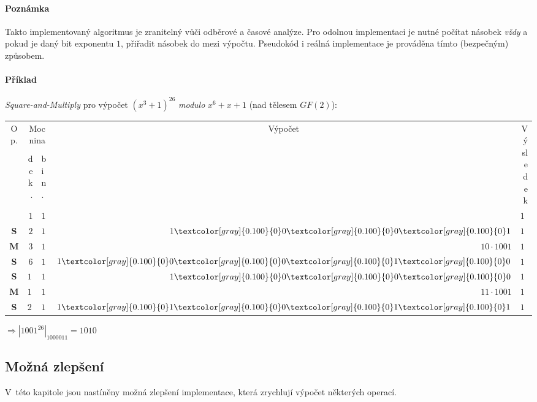 \documentclass[thesis=M,czech,hidelinks]{FITthesis}[2012/06/26]
\newcommand{\0}{{\textcolor[gray]{0.100}{0}}}
\begin{document}
\paragraph{Poznámka} Takto implementovaný algoritmus je zranitelný vůči odběrové
a časové analýze. Pro odolnou implementaci je nutné počítat násobek \emph{vždy} a
pokud je daný bit exponentu $1$, přiřadit násobek do mezi výpočtu.
Pseudokód i reálná implementace je prováděna tímto (bezpečným) způsobem.

\paragraph{Příklad} \emph{Square-and-Multiply} pro výpočet
$\left(x^3+1\right)^{26}$ \emph{modulo} $x^6+x+1$ (nad tělesem $GF(2)$):

\begin{center}
    \begin{tabular}{c|r|l|r|r}
        \multirow{2}{*}{Op.} & \multicolumn{2}{c}{Mocnina} & \multicolumn{1}{c}{\multirow{2}{*}{Výpočet}} & \multirow{2}{*}{Výsledek} \\
                &  dek. & bin.    &                   &              \\
        \hline
        \hline
                & $  1$ & $1    $ &                   & $ 1001$      \\
        \hline
    \textbf{S}  & $  2$ & $1    $ & $    1\00\00\01 $ & $   10$      \\
    \textbf{M}  & $  3$ & $11   $ & $ 10 \cdot 1001 $ & $10010$      \\
        \hline
    \textbf{S}  & $  6$ & $110  $ & $ 1\00\00\01\00 $ & $ 1000$      \\
        \hline
    \textbf{S}  & $ 12$ & $1100 $ & $    1\00\00\00 $ & $   11$      \\
    \textbf{M}  & $ 13$ & $1101 $ & $ 11 \cdot 1001 $ & $11011$      \\
        \hline
    \textbf{S}  & $ 26$ & $11010$ & $     1\01\00\01\01 $ & $ 1010$      \\
    \end{tabular}
\end{center}
$ \Rightarrow \left|1001^{26}\right|_{1000011} = 1010 $

\subsection{Možná zlepšení}
V~této kapitole jsou nastíněny možná zlepšení implementace, která
zrychlují výpočet některých operací.
\end{document}
